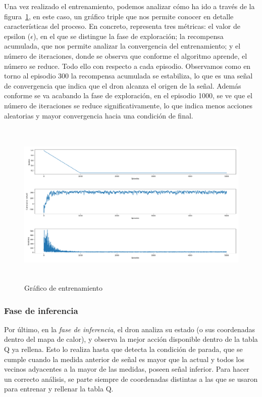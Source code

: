 Una vez realizado el entrenamiento, podemos analizar cómo ha ido a través de la figura~\ref{fig:training_graph}, en este caso, un gráfico triple que nos permite conocer en detalle características del proceso. En concreto, representa tres métricas: el valor de epsilon ($\epsilon$), en el que se distingue la fase de exploración; la recompensa acumulada, que nos permite analizar la convergencia del entrenamiento; y el número de iteraciones, donde se observa que conforme el algoritmo aprende, el número se reduce. Todo ello con respecto a cada episodio. Observamos como en torno al episodio 300 la recompensa acumulada se estabiliza, lo que es una señal de convergencia que indica que el dron alcanza el origen de la señal. Además conforme se va acabando la fase de exploración, en el episodio 1000, se ve que el número de iteraciones se reduce significativamente, lo que indica menos acciones aleatorias y mayor convergencia hacia una condición de final.\\

\begin{figure} [t]
    \begin{center}
    \includegraphics[height=8cm]{imagenes/cap4/14_training_graph.png}
    \end{center}
    \caption[Gráfico de entrenamiento]{Gráfico de entrenamiento}
    \label{fig:training_graph}
\end{figure}

\subsubsection{Fase de inferencia}
\label{subsubsec:test}

Por último, en la \emph{fase de inferencia}, el dron analiza su estado (o sus coordenadas dentro del mapa de calor), y observa la mejor acción disponible dentro de la tabla Q ya rellena. Esto lo realiza hasta que detecta la condición de parada, que se cumple cuando la medida anterior de señal es mayor que la actual y todos los vecinos adyacentes a la mayor de las medidas, poseen señal inferior. Para hacer un correcto análisis, se parte siempre de coordenadas distintas a las que se usaron para entrenar y rellenar la tabla Q.

